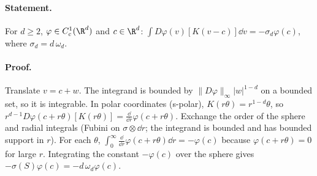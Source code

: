 \paragraph{Statement.} For $d\geq2$, $\varphi\in C^1_c(\R^d)$ and $c\in\R^d$:
$\int D\varphi(v)[K(v-c)]\dd v=-\sigma_d\varphi(c)$, where $\sigma_d=d\,\omega_d$.
\paragraph{Proof.} Translate $v=c+w$. The integrand is bounded by $\|D\varphi\|_\infty|w|^{1-d}$ on a bounded set, so
it is integrable. In polar coordinates (s-polar), $K(r\theta)=r^{1-d}\theta$, so
$r^{d-1}D\varphi(c+r\theta)[K(r\theta)]=\frac{\dd}{\dd r}\varphi(c+r\theta)$. Exchange the order of the sphere and
radial integrals (Fubini on $\sigma\otimes\dd r$; the integrand is bounded and has bounded support in $r$). For each
$\theta$, $\int_0^\infty\frac{\dd}{\dd r}\varphi(c+r\theta)\dd r=-\varphi(c)$ because $\varphi(c+r\theta)=0$ for large $r$.
Integrating the constant $-\varphi(c)$ over the sphere gives $-\sigma(S)\varphi(c)=-d\,\omega_d\varphi(c)$.
